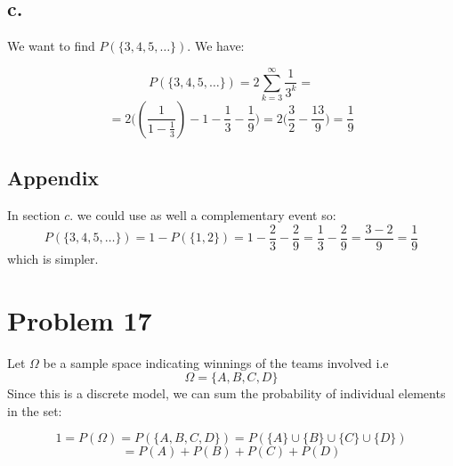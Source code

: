\documentclass{article}
\begin{document}
\subsection*{c.}

We want to find \(P(\{3, 4, 5, \dots\})\). We have:

\begin{equation*}
    P(\{3, 4, 5, \dots\}) = 2 \sum_{k=3}^{\infty} \frac{1}{3^{k}} = 
\end{equation*}
\begin{equation*}
    = 2 \Big( (\frac{1}{1 - \frac{1}{3}}) - 1 - \frac{1}{3} - \frac{1}{9} \Big) = 2\Big( \frac{3}{2} - \frac{13}{9} \Big) =  \frac{1}{9}
\end{equation*}

\subsection*{Appendix}
In section \(c.\) we could use as well a complementary event so:
\begin{equation*}
    P(\{3, 4, 5, \dots\}) = 1 - P(\{1, 2\}) = 1 - \frac{2}{3} - \frac{2}{9} = \frac{1}{3} - \frac{2}{9} = \frac{3 - 2}{9} = \frac{1}{9}
\end{equation*}
which is simpler.

\section*{Problem 17}

Let \(\Omega\) be a sample space indicating winnings of the teams involved i.e
\begin{equation*}
    \Omega = \{A, B, C, D\}
\end{equation*}
Since this is a discrete model, we can sum the probability of individual elements in the set:

\begin{equation*}
    1 = P(\Omega) = P(\{A, B, C, D\}) = P(\{A\} \cup \{B\} \cup \{C\} \cup \{D\})
\end{equation*}
\begin{equation*}
    = P(A) + P(B) + P(C) + P(D)
\end{equation*}
\end{document}

